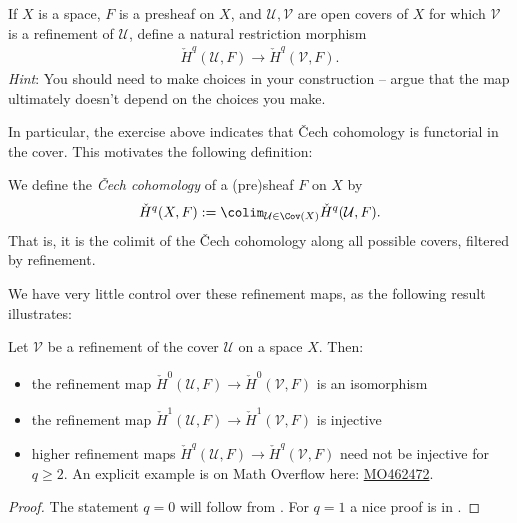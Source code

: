 \documentclass[11pt]{book}
\begin{document}
\begin{exercise} If $X$ is a space, $F$ is a presheaf on $X$, and $\mathcal{U},\mathcal{V}$ are open covers of $X$ for which $\mathcal{V}$ is a refinement of $\mathcal{U}$, define a natural restriction morphism
\begin{align*}
    \check{H}^q(\mathcal{U},F) \to \check{H}^q(\mathcal{V},F).
\end{align*}
\textit{Hint}: You should need to make choices in your construction -- argue that the map ultimately doesn't depend on the choices you make.
\end{exercise}

In particular, the exercise above indicates that \v{C}ech cohomology is functorial in the cover. This motivates the following definition:

\begin{definition}\label{def:Cech-cohomology} 
We define the \emph{\v{C}ech cohomology} of a (pre)sheaf $F$ on $X$ by
\begin{align*}
    \check{H}^q(X,F) := \colim_{\mathcal{U}\in \Cov(X)} \check{H}^q(\mathcal{U},F).
\end{align*}
That is, it is the colimit of the \v{C}ech cohomology along all possible covers, filtered by refinement.
\end{definition}

We have very little control over these refinement maps, as the following result illustrates:

\begin{proposition}\label{prop:injectivity-of-refinement-of-Cech-cohomology} Let $\mathcal{V}$ be a refinement of the cover $\mathcal{U}$ on a space $X$. Then:
\begin{itemize}
    \item the refinement map $\check{H}^0(\mathcal{U},F) \to \check{H}^0(\mathcal{V},F)$ is an isomorphism
    \item the refinement map $\check{H}^1(\mathcal{U},F) \to \check{H}^1(\mathcal{V},F)$ is injective
    \item higher refinement maps $\check{H}^q(\mathcal{U},F) \to \check{H}^q(\mathcal{V},F)$ need not be injective for $q\ge 2$. An explicit example is on Math Overflow here: \href{https://mathoverflow.net/a/462472}{MO462472}.
\end{itemize}
\end{proposition}
\begin{proof} The statement $q=0$ will follow from . For $q=1$ a nice proof is in \cite[12.4]{Forster}.
\end{proof}
\end{document}

